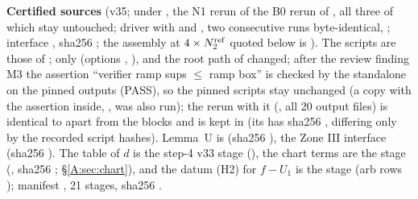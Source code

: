 \documentclass[11pt]{article}
\begin{document}
\noindent\textbf{Certified sources} (v35; under , the N1 rerun of the B0 rerun  of , all three of which stay untouched; driver  with  and , two consecutive runs byte-identical, ; interface , sha256 ; the assembly at $4\times N_2^{\rm ref}$ quoted below is ). The scripts are those of ; only  (options , ),  and the root path of  changed; after the review finding M3 the assertion ``verifier ramp sups $\le$ ramp box'' is checked by the standalone  on the pinned outputs (PASS), so the pinned scripts stay unchanged (a copy with the assertion inside, , was also run); the rerun with it (, all 20 output files) is identical to  apart from the  blocks and is kept in  (its  has sha256 , differing only by the recorded script hashes). Lemma~U is  (sha256 ), the Zone III interface  (sha256 ). The table of $d$ is the step-4 v33 stage  (), the chart terms are the stage  (, sha256 ; \S\ref{A:sec:chart}), and the datum (H2) for $f-U_1$ is the stage  (arb rows ); manifest , 21 stages, sha256 .
\end{document}
